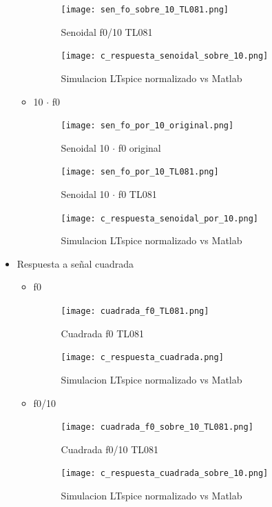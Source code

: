 \documentclass[11pt]{diazessay} %
\begin{document}
\begin{itemize}
\begin{itemize}
\begin{figure}[h]
\centering
	\texttt{[image: sen\_fo\_sobre\_10\_TL081.png]}
\caption{Senoidal f0/10 TL081}
\end{figure}

\newpage
\begin{figure}[h]
\centering
	\texttt{[image: c\_respuesta\_senoidal\_sobre\_10.png]}
\caption{Simulacion LTspice normalizado vs Matlab}
\end{figure}


\newpage
\item 10 $\cdot$ f0
\begin{figure}[h]
\centering
	\texttt{[image: sen\_fo\_por\_10\_original.png]}
\caption{Senoidal 10 $\cdot$ f0 original}
\end{figure}

\begin{figure}[h]
\centering
	\texttt{[image: sen\_fo\_por\_10\_TL081.png]}
\caption{Senoidal 10 $\cdot$ f0 TL081}
\end{figure}

\newpage
\begin{figure}[h]
\centering
	\texttt{[image: c\_respuesta\_senoidal\_por\_10.png]}
\caption{Simulacion LTspice normalizado vs Matlab}
\end{figure}


\end{itemize}

\newpage
\item Respuesta a señal cuadrada
\begin{itemize}
\item f0
\begin{figure}[h]
\centering
	\texttt{[image: cuadrada\_f0\_TL081.png]}
\caption{Cuadrada f0 TL081}
\end{figure}

\newpage
\begin{figure}[h]
\centering
	\texttt{[image: c\_respuesta\_cuadrada.png]}
\caption{Simulacion LTspice normalizado vs Matlab}
\end{figure}


\newpage
\item f0/10
\begin{figure}[h]
\centering
	\texttt{[image: cuadrada\_f0\_sobre\_10\_TL081.png]}
\caption{Cuadrada f0/10 TL081}
\end{figure}

\newpage
\begin{figure}[h]
\centering
	\texttt{[image: c\_respuesta\_cuadrada\_sobre\_10.png]}
\caption{Simulacion LTspice normalizado vs Matlab}
\end{figure}


\end{itemize}
\end{itemize}
\end{document}
